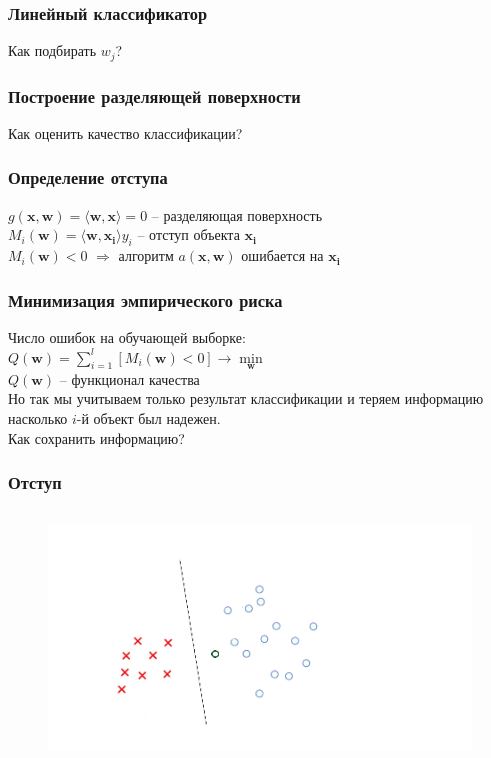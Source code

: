\documentclass[12pt]{beamer}
\begin{document}
\begin{frame}\frametitle{Линейный классификатор}
Как подбирать $w_j$?
\end{frame}

\begin{frame}\frametitle{Построение разделяющей поверхности}
Как оценить качество классификации?
\end{frame}

\begin{frame}\frametitle{Определение отступа}
${g(\mathbf{x}, \mathbf{w}) = \langle \mathbf{w}, \mathbf{x}\rangle = 0}$ -- разделяющая поверхность\\
$M_i(\mathbf{w}) = \langle \mathbf{w}, \mathbf{x_i}\rangle y_i$ -- отступ объекта $\mathbf{x_i}$\\
${M_i(\mathbf{w})<0}$ $\Rightarrow$ алгоритм $a(\mathbf{x},\mathbf{w})$ ошибается на $\mathbf{x_i}$
\end{frame}

\begin{frame}\frametitle{Минимизация эмпирического риска}
Число ошибок на обучающей выборке:\\
\vspace{5mm}
${Q(\mathbf{w}) = \sum\limits_{i=1}^l \left[ M_i(\mathbf{w}) < 0 \right] \rightarrow \min\limits_{\mathbf{w}} }$\\
\vspace{3mm}
${Q(\mathbf{w})}$ -- функционал качества\\
\vspace{5mm}
Но так мы учитываем только результат классификации и теряем информацию насколько ${i}$-й объект был надежен.\\
\vspace{3mm}
Как сохранить информацию?

\end{frame}

\begin{frame}\frametitle{Отступ}
\begin{figure}[htbp]
  \includegraphics[height=190pt, keepaspectratio = true]{images/margin1}   
\end{figure}
\end{frame}
\end{document}
